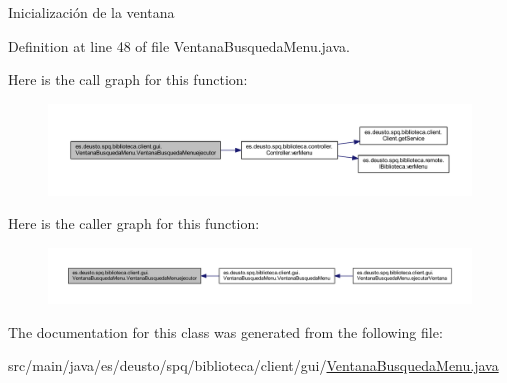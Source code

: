 Inicialización de la ventana 

Definition at line 48 of file Ventana\+Busqueda\+Menu.\+java.

Here is the call graph for this function\+:
\nopagebreak
\begin{figure}[H]
\begin{center}
\leavevmode
\includegraphics[width=350pt]{classes_1_1deusto_1_1spq_1_1biblioteca_1_1client_1_1gui_1_1_ventana_busqueda_menu_a2e14e0da230c4e460dd7e656b53622b0_cgraph}
\end{center}
\end{figure}
Here is the caller graph for this function\+:
\nopagebreak
\begin{figure}[H]
\begin{center}
\leavevmode
\includegraphics[width=350pt]{classes_1_1deusto_1_1spq_1_1biblioteca_1_1client_1_1gui_1_1_ventana_busqueda_menu_a2e14e0da230c4e460dd7e656b53622b0_icgraph}
\end{center}
\end{figure}


The documentation for this class was generated from the following file\+:\begin{DoxyCompactItemize}
\item 
src/main/java/es/deusto/spq/biblioteca/client/gui/\mbox{\hyperlink{_ventana_busqueda_menu_8java}{Ventana\+Busqueda\+Menu.\+java}}\end{DoxyCompactItemize}

